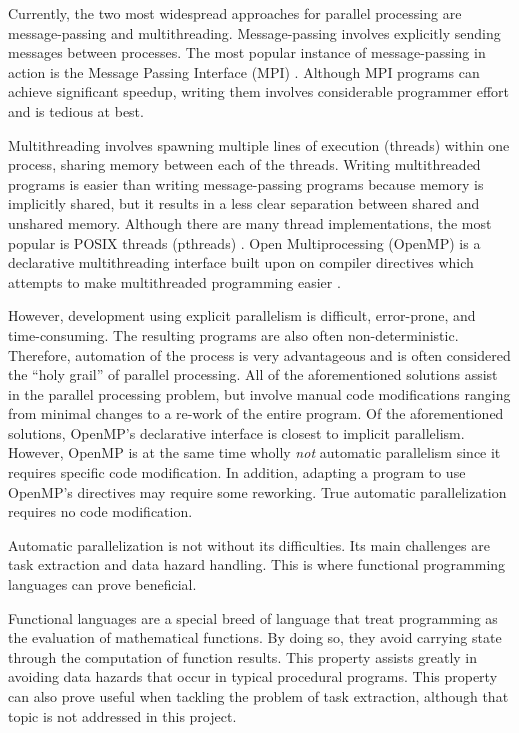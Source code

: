\documentclass[
abstracton,
fontsize=12pt,
]{scrartcl}
\begin{document}
Currently, the two most widespread approaches for parallel processing are message-passing and multithreading. Message-passing involves explicitly sending messages between processes. The most popular instance of message-passing in action is the Message Passing Interface (MPI) \autocite{gabriel04:_open_mpi}. Although MPI programs can achieve significant speedup, writing them involves considerable programmer effort and is tedious at best.

Multithreading involves spawning multiple lines of execution (threads) within one process, sharing memory between each of the threads. Writing multithreaded programs is easier than writing message-passing programs because memory is implicitly shared, but it results in a less clear separation between shared and unshared memory. Although there are many thread implementations, the most popular is POSIX threads (pthreads) \autocite{pthreads}. Open Multiprocessing (OpenMP) is a declarative multithreading interface built upon on compiler directives which attempts to make multithreaded programming easier \autocite{openmp-specs}.

However, development using explicit parallelism is difficult, error-prone, and time-consuming. The resulting programs are also often non-deterministic. Therefore, automation of the process is very advantageous and is often considered the ``holy grail'' of parallel processing. All of the aforementioned solutions assist in the parallel processing problem, but involve manual code modifications ranging from minimal changes to a re-work of the entire program. Of the aforementioned solutions, OpenMP's declarative interface is closest to implicit parallelism. However, OpenMP is at the same time wholly \emph{not} automatic parallelism since it requires specific code modification. In addition, adapting a program to use OpenMP's directives may require some reworking. True automatic parallelization requires no code modification.

Automatic parallelization is not without its difficulties. Its main challenges are task extraction and data hazard handling. This is where functional programming languages can prove beneficial.

Functional languages are a special breed of language that treat programming as the evaluation of mathematical functions. By doing so, they avoid carrying state through the computation of function results. This property assists greatly in avoiding data hazards that occur in typical procedural programs. This property can also prove useful when tackling the problem of task extraction, although that topic is not addressed in this project.
\end{document}
